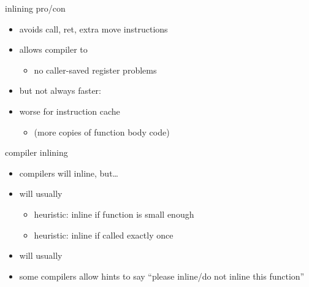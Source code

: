 \begin{frame}[fragile,label=inlineProCon]{inlining pro/con}
    \begin{itemize}
        \item avoids call, ret, extra move instructions
        \item allows compiler to 
            \begin{itemize}
            \item no caller-saved register problems
            \end{itemize}
        \vspace{.5cm}
        \item but not always faster:
        \item worse for instruction cache
            \begin{itemize}
            \item (more copies of function body code)
            \end{itemize}
    \end{itemize}
\end{frame}

\begin{frame}{compiler inlining}
    \begin{itemize}
    \item compilers will inline, but\ldots
    \item will usually 
        \begin{itemize}
        \item heuristic: inline if function is small enough
        \item heuristic: inline if called exactly once
        \end{itemize}
    \item will usually 
    \vspace{.5cm}
    \item some compilers allow hints to say ``please inline/do not inline this function''
    \end{itemize}
\end{frame}

